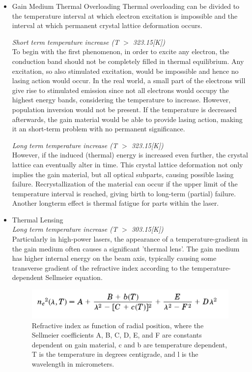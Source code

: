 \begin{itemize}
	\item Gain Medium Thermal Overloading
Thermal overloading can be divided to the temperature interval at which electron excitation is impossible and the interval at which permanent crystal lattice deformation occurs.

\textit{Short term temperature increase (T $>$ 323.15[K])}\\
To begin with the first phenomenon, in order to excite any electron, the conduction band should not be completely filled in thermal equilibrium. Any excitation, so also stimulated excitation, would be impossible and hence no lasing action would occur. In the real world, a small part of the electrons will give rise to stimulated emission since not all electrons would occupy the highest energy bands, considering the temperature to increase. However, population inversion would not be present. If the temperature is decreased afterwards, the gain material would be able to provide lasing action, making it an short-term problem with no permanent significance. 

\textit{Long term temperature increase (T $>$ 323.15[K])}\\
However, if the induced (thermal) energy is increased even further, the crystal lattice can eventually alter in time. This crystal lattice deformation not only implies the gain material, but all optical subparts, causing possible lasing failure. Recrystallization of the material can occur if the upper limit of the temperature interval is reached, giving birth to long-term (partial) failure. Another longterm effect is thermal fatigue for parts within the laser.
	
\item Thermal Lensing\\
\textit{Long term temperature increase (T $>$ 303.15[K])}\\
Particularly in high-power lasers, the appearance of a temperature-gradient in the gain medium often causes a significant 'thermal lens'. The gain medium has higher internal energy on the beam axis, typically causing some transverse gradient of the refractive index according to the temperature-dependent Sellmeier equation. 

\begin{figure}[ht!]
	\begin{center}
\includegraphics[scale=0.5]{chapters/img/TISE.png}	
\caption{Refractive index as function of radial position, where the Sellmeier coefficients A, B, C, D, E, and F are constants dependent on gain material, c and b are temperature dependent, T is the temperature in degrees centigrade, and l is the wavelength in micrometers.}
\label{thermal_lensing}
\end{center}
\end{figure}


\end{itemize}
